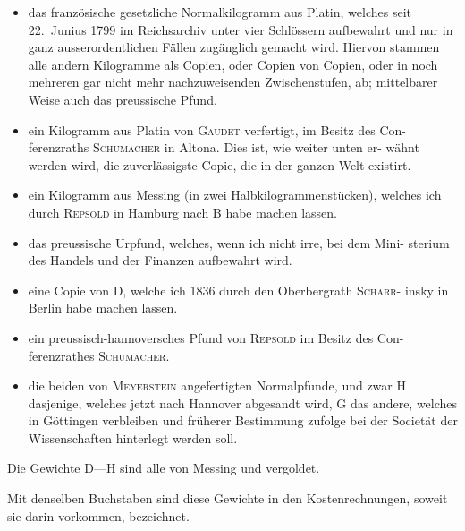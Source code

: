 \documentclass[12pt,a4paper]{article}
\theoremstyle{plain}
\theoremstyle{definition}
\theoremstyle{remark}
\begin{document}
\begin{itemize}[leftmargin=2cm]
\item[A.] das franz\"osische gesetzliche Normalkilogramm aus Platin, welches seit
22.~Junius 1799 im Reichsarchiv unter vier Schl\"ossern aufbewahrt
und nur in ganz ausserordentlichen F\"allen zug\"anglich gemacht wird.
Hiervon stammen alle andern Kilogramme als Copien, oder Copien
von Copien, oder in noch mehreren gar nicht mehr nachzuweisenden
Zwischenstufen, ab; mittelbarer Weise auch das preussische Pfund.
\item[B.] ein Kilogramm aus Platin von \textsc{Gaudet} verfertigt, im Besitz des Con-
ferenzraths \textsc{Schumacher} in Altona. Dies ist, wie weiter unten er-
w\"ahnt werden wird, die zuverl\"assigste Copie, die in der ganzen Welt
existirt.
\item[C.] ein Kilogramm aus Messing (in zwei Halbkilogrammenst\"ucken), welches
ich durch \textsc{Repsold} in Hamburg nach B habe machen lassen.
\item[D.] das preussische Urpfund, welches, wenn ich nicht irre, bei dem Mini-
sterium des Handels und der Finanzen aufbewahrt wird.
\item[E.] eine Copie von D, welche ich 1836 durch den Oberbergrath \textsc{Scharr}-\- \linebreak
insky in Berlin habe machen lassen.
\item[F.] ein preussisch-hannoversches Pfund von \textsc{Repsold} im Besitz des Con-
ferenzrathes \textsc{Schumacher}.
\item[G. und H.] die beiden von \textsc{Meyerstein} angefertigten Normalpfunde, und
zwar H dasjenige, welches jetzt nach Hannover abgesandt wird, G das
andere, welches in G\"ottingen verbleiben und fr\"uherer Bestimmung
zufolge bei der Societ\"at der Wissenschaften hinterlegt werden soll.
\end{itemize}

Die Gewichte D---H sind alle von Messing und vergoldet.

Mit denselben Buchstaben sind diese Gewichte in den Kostenrechnungen,
soweit sie darin vorkommen, bezeichnet.
\end{document}
